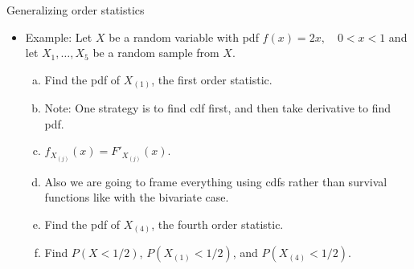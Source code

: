 \documentclass{article}
\newcommand{\vecn}[2]{#1_1, \ldots, #1_{#2}}	%
\newcommand{\order}[2]{#1_{(#2)}}		%
\begin{document}
Generalizing order statistics\bigskip
\begin{itemize}
    \item Example: Let $X$ be a random variable with pdf $f(x) = 2x, \quad 0 < x < 1$ and let $\vecn{X}{5}$ be a random sample from $X$.
    \begin{enumerate}[(a)]
        \item Find the pdf of $\order{X}{1}$, the first order statistic.
        \item[] Note: One strategy is to find cdf first, and then take derivative to find pdf.
        \item[] $f_{\order{X}{j}}(x) = F'_{\order{X}{j}}(x)$.
        \item[] Also we are going to frame everything using cdfs rather than survival functions like with the bivariate case.\newpage
        \item Find the pdf of $\order{X}{4}$, the fourth order statistic.\vspace{220pt}
        \item Find $P(X < 1/2)$, $P(\order{X}{1} < 1/2)$, and $P(\order{X}{4} < 1/2)$.\vspace{150pt}
    \end{enumerate}
\end{itemize}\bigskip
\end{document}

